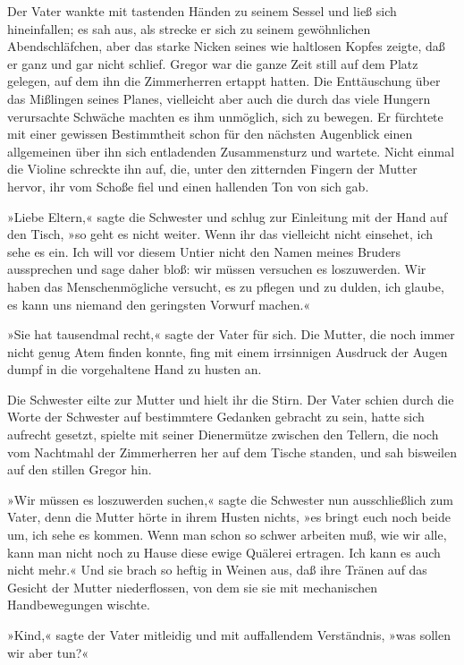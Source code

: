 Der Vater wankte mit tastenden Händen zu seinem Sessel und ließ sich
hineinfallen; es sah aus, als strecke er sich zu seinem gewöhnlichen
Abendschläfchen, aber das starke Nicken seines wie haltlosen Kopfes
zeigte, daß er ganz und gar nicht schlief. Gregor war die ganze Zeit
still auf dem Platz gelegen, auf dem ihn die Zimmerherren ertappt
hatten. Die Enttäuschung über das Mißlingen seines Planes, vielleicht
aber auch die durch das viele Hungern verursachte Schwäche machten es
ihm unmöglich, sich zu bewegen. Er fürchtete mit einer gewissen
Bestimmtheit schon für den nächsten Augenblick einen allgemeinen über
ihn sich entladenden Zusammensturz und wartete. Nicht einmal die Violine
schreckte ihn auf, die, unter den zitternden Fingern der Mutter hervor,
ihr vom Schoße fiel und einen hallenden Ton von sich gab.

»Liebe Eltern,« sagte die Schwester und schlug zur Einleitung mit der
Hand auf den Tisch, »so geht es nicht weiter. Wenn ihr das vielleicht
nicht einsehet, ich sehe es ein. Ich will vor diesem Untier nicht den
Namen meines Bruders aussprechen und sage daher bloß: wir müssen
versuchen es loszuwerden. Wir haben das Menschenmögliche versucht, es zu
pflegen und zu dulden, ich glaube, es kann uns niemand den geringsten
Vorwurf machen.«

»Sie hat tausendmal recht,« sagte der Vater für sich. Die Mutter, die
noch immer nicht genug Atem finden konnte, fing mit einem irrsinnigen
Ausdruck der Augen dumpf in die vorgehaltene Hand zu husten an.

Die Schwester eilte zur Mutter und hielt ihr die Stirn. Der Vater schien
durch die Worte der Schwester auf bestimmtere Gedanken gebracht zu sein,
hatte sich aufrecht gesetzt, spielte mit seiner Dienermütze zwischen den
Tellern, die noch vom Nachtmahl der Zimmerherren her auf dem Tische
standen, und sah bisweilen auf den stillen Gregor hin.

»Wir müssen es loszuwerden suchen,« sagte die Schwester nun
ausschließlich zum Vater, denn die Mutter hörte in ihrem Husten nichts,
»es bringt euch noch beide um, ich sehe es kommen. Wenn man schon so
schwer arbeiten muß, wie wir alle, kann man nicht noch zu Hause diese
ewige Quälerei ertragen. Ich kann es auch nicht mehr.« Und sie brach so
heftig in Weinen aus, daß ihre Tränen auf das Gesicht der Mutter
niederflossen, von dem sie sie mit mechanischen Handbewegungen wischte.

»Kind,« sagte der Vater mitleidig und mit auffallendem Verständnis, »was
sollen wir aber tun?«

